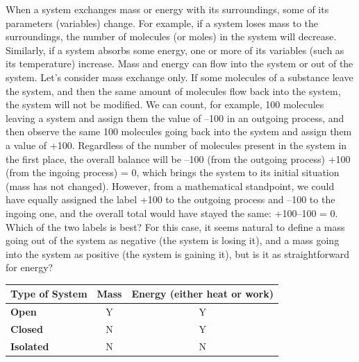 \documentclass[
  9pt,
]{extbook}
\theoremstyle{definition}
\theoremstyle{definition}
\theoremstyle{definition}
\theoremstyle{remark}
\begin{document}
When a system exchanges mass or energy with its surroundings, some of its parameters (variables) change. For example, if a system loses mass to the surroundings, the number of molecules (or moles) in the system will decrease. Similarly, if a system absorbs some energy, one or more of its variables (such as its temperature) increase. Mass and energy can flow into the system or out of the system. Let's consider mass exchange only. If some molecules of a substance leave the system, and then the same amount of molecules flow back into the system, the system will not be modified. We can count, for example, 100 molecules leaving a system and assign them the value of --100 in an outgoing process, and then observe the same 100 molecules going back into the system and assign them a value of +100. Regardless of the number of molecules present in the system in the first place, the overall balance will be --100 (from the outgoing process) +100 (from the ingoing process) = 0, which brings the system to its initial situation (mass has not changed). However, from a mathematical standpoint, we could have equally assigned the label +100 to the outgoing process and --100 to the ingoing one, and the overall total would have stayed the same: +100--100 = 0. Which of the two labels is best? For this case, it seems natural to define a mass going out of the system as negative (the system is losing it), and a mass going into the system as positive (the system is gaining it), but is it as straightforward for energy?

\begin{longtable}[]{@{}lcc@{}}
\toprule
\textbf{Type of System} & \textbf{Mass} & \textbf{Energy} (either heat or work) \\
\midrule
\endhead
\textbf{Open} & Y & Y \\
\textbf{Closed} & N & Y \\
\textbf{Isolated} & N & N \\
\bottomrule
\end{longtable}
\end{document}
